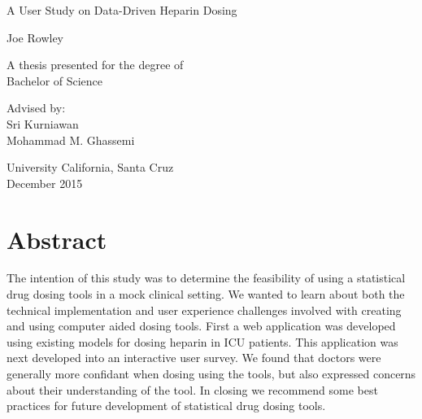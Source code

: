 \documentclass[12pt,a4paper,]{report}
\date{}
\begin{document}
\begin{titlepage}
    \begin{center}

        
        \vspace*{2.5cm}
        
        \huge
        A User Study on Data-Driven Heparin Dosing 
        
        \vspace{1.5cm}
        
        \Large
        Joe Rowley

        \vspace{1.5cm}

        \normalsize
        A thesis presented for the degree of\\
        Bachelor of Science
        
        \vfill
        
        \normalsize
        Advised by:\\
        Sri Kurniawan\\
        Mohammad M. Ghassemi\\
        
        \vspace{0.8cm}

        
        \normalsize
        University California, Santa Cruz\\
        December 2015


    \end{center}
\end{titlepage}

\chapter*{Abstract}\label{abstract}

The intention of this study was to determine the feasibility of using a
statistical drug dosing tools in a mock clinical setting. We wanted to
learn about both the technical implementation and user experience
challenges involved with creating and using computer aided dosing tools.
First a web application was developed using existing models for dosing
heparin in ICU patients. This application was next developed into an
interactive user survey. We found that doctors were generally more
confidant when dosing using the tools, but also expressed concerns about
their understanding of the tool. In closing we recommend some best
practices for future development of statistical drug dosing tools.
\end{document}
